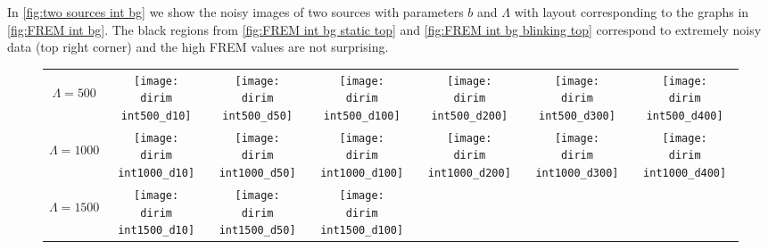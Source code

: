 %
In \autoref{fig:two sources int bg} we show the noisy images of two sources with parameters $b$ and $\Lambda$ with layout corresponding to the graphs in \autoref{fig:FREM int bg}.  The black regions from \autoref{fig:FREM int bg static top} and \autoref{fig:FREM int bg blinking top} correspond to extremely noisy data (top right corner) and the high FREM values are not surprising. 

\begin{figure}[!bt]
	\centering
	\newcommand{\wf}{.13\textwidth}
	\newcommand{\dirim}{\qd gFREM/images/psf3/text_twosources_}
	\newcommand{\vs}{.1}
	\begin{tabular}{c|cccccc}
		\begin{sideways}\hspace{\vs cm}$\Lambda=500$\end{sideways}
		&\texttt{[image: \\dirim int500\_d10]}
		&\texttt{[image: \\dirim int500\_d50]}
		&\texttt{[image: \\dirim int500\_d100]}
		&\texttt{[image: \\dirim int500\_d200]}
		&\texttt{[image: \\dirim int500\_d300]}
		&\texttt{[image: \\dirim int500\_d400]}\\		
		\begin{sideways}\hspace{\vs cm}$\Lambda=1000$\end{sideways}
		&\texttt{[image: \\dirim int1000\_d10]}
		&\texttt{[image: \\dirim int1000\_d50]}
		&\texttt{[image: \\dirim int1000\_d100]}
		&\texttt{[image: \\dirim int1000\_d200]}
		&\texttt{[image: \\dirim int1000\_d300]}
		&\texttt{[image: \\dirim int1000\_d400]}\\
		\begin{sideways}\hspace{\vs cm}$\Lambda=1500$\end{sideways}
		&\texttt{[image: \\dirim int1500\_d10]}
		&\texttt{[image: \\dirim int1500\_d50]}
		&\texttt{[image: \\dirim int1500\_d100]}

\end{tabular}
\end{figure}
